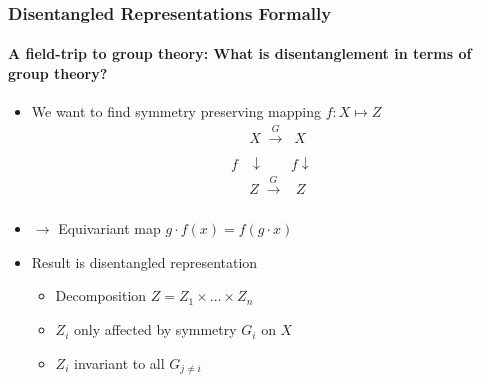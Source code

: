 \documentclass[9pt]{beamer}
\begin{document}
\begin{frame}
\frametitle{Disentangled Representations Formally}
\framesubtitle{A field-trip to group theory: What is disentanglement in terms of group theory?}
\begin{itemize}%
	\item We want to find symmetry preserving mapping $f:X \mapsto Z$
	\begin{align*}
		&X \;\xrightarrow[\text{}]{G}\;\;X\\ 
		f&\downarrow \;\;\;\;\;\;\;f\downarrow\\
		&Z \;\xrightarrow[\text{}]{G}\;\;\;Z
	\end{align*}
	\item $\rightarrow$ Equivariant map $g \cdot f(x) = f(g\cdot x)$
	\item Result is disentangled representation
	\begin{itemize}
		\item Decomposition $Z = Z_{1} \times ... \times Z_{n}$
		\item $Z_{i}$ only affected by symmetry $G_i$ on $X$%
		\item $Z_i$ invariant to all $G_{j \neq i}$%
	\end{itemize}
\end{itemize}
\end{frame} 
\end{document}
